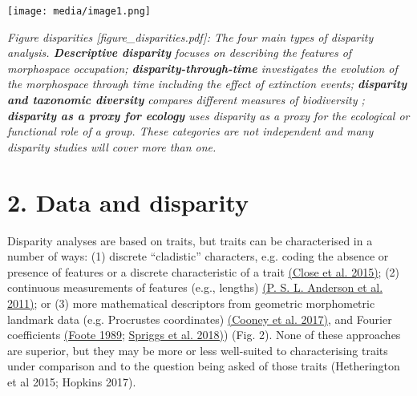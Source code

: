 \texttt{[image: media/image1.png]}

\emph{Figure disparities {[}figure\_disparities.pdf{]}: The four main types of disparity analysis. \textbf{Descriptive disparity} focuses on describing the features of morphospace occupation; \textbf{disparity-through-time} investigates the evolution of the morphospace through time including the effect of extinction events; \textbf{disparity and taxonomic diversity} compares different measures of biodiversity ; \textbf{disparity as a proxy for ecology} uses disparity as a proxy for the ecological or functional role of a group.
These categories are not independent and many disparity studies will cover more than one.}



\hypertarget{data-and-disparity}{%
\section{2. Data and disparity }\label{data-and-disparity}}

Disparity analyses are based on traits, but traits can be characterised in a number of ways:
(1) discrete ``cladistic'' characters, e.g. coding the absence or presence of features or a discrete characteristic of a trait \href{https://paperpile.com/c/sTGYvp/PbSx}{(Close et al. 2015)};
(2) continuous measurements of features (e.g., lengths) \href{https://paperpile.com/c/sTGYvp/qjj9}{(P. S. L. Anderson et al. 2011)}; or
(3) more mathematical descriptors from geometric morphometric landmark data (e.g. Procrustes coordinates) \href{https://paperpile.com/c/sTGYvp/RjqE}{(Cooney et al. 2017)}, and Fourier coefficients \href{https://paperpile.com/c/sTGYvp/2Neu}{(Foote 1989;} \href{https://paperpile.com/c/sTGYvp/ZEDR}{Spriggs et al. 2018)}) (Fig. 2).
None of these approaches are superior, but they may be more or less well-suited to characterising traits under comparison and to the question being asked of those traits (Hetherington et al 2015; Hopkins 2017).

